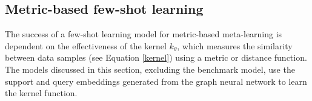 \documentclass[journal=acscii,manuscript=article]{achemso}
\begin{document}




\subsection{Metric-based few-shot learning}

The success of a few-shot learning model for metric-based meta-learning is dependent on the effectiveness of the kernel $k_\theta$, which measures the similarity between data samples (see Equation \ref{kernel}) using a metric or distance function. The models discussed in this section, excluding the benchmark model, use the support and query embeddings generated from the graph neural network to learn the kernel function.
\end{document}
